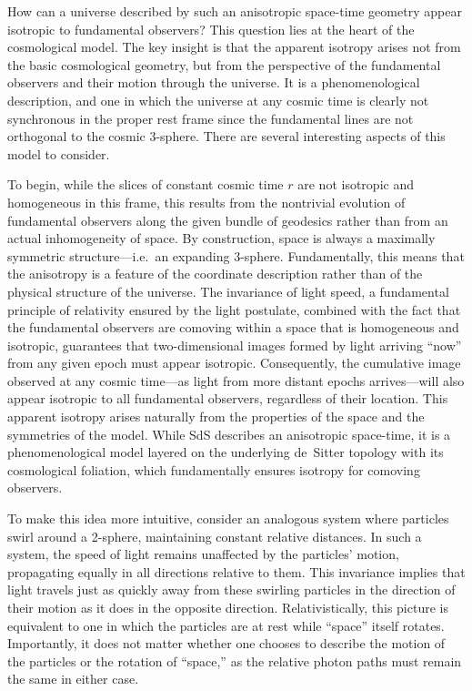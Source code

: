 \documentclass[aps,rmp,groupedaddress,twocolumn,10pt]{revtex4-2}
\begin{document}
How can a universe described by such an anisotropic space-time geometry appear isotropic to fundamental observers? This question lies at the heart of the cosmological model. The key insight is that the apparent isotropy arises not from the basic cosmological geometry, but from the perspective of the fundamental observers and their motion through the universe. It is a phenomenological description, and one in which the universe at any cosmic time is clearly not synchronous in the proper rest frame since the fundamental lines are not orthogonal to the cosmic 3-sphere. There are several interesting aspects of this model to consider.

To begin, while the slices of constant cosmic time $r$ are not isotropic and homogeneous in this frame, this results from the nontrivial evolution of fundamental observers along the given bundle of geodesics rather than from an actual inhomogeneity of space. By construction, space is always a maximally symmetric structure---i.e.\ an expanding 3-sphere. Fundamentally, this means that the anisotropy is a feature of the coordinate description rather than of the physical structure of the universe. The invariance of light speed, a fundamental principle of relativity ensured by the light postulate, combined with the fact that the fundamental observers are comoving within a space that is homogeneous and isotropic, guarantees that two-dimensional images formed by light arriving ``now'' from any given epoch must appear isotropic. Consequently, the cumulative image observed at any cosmic time---as light from more distant epochs arrives---will also appear isotropic to all fundamental observers, regardless of their location. This apparent isotropy arises naturally from the properties of the space and the symmetries of the model. While SdS describes an anisotropic space-time, it is a phenomenological model layered on the underlying de~Sitter topology with its cosmological foliation, which fundamentally ensures isotropy for comoving observers.

To make this idea more intuitive, consider an analogous system where particles swirl around a 2-sphere, maintaining constant relative distances. In such a system, the speed of light remains unaffected by the particles' motion, propagating equally in all directions relative to them. This invariance implies that light travels just as quickly away from these swirling particles in the direction of their motion as it does in the opposite direction. Relativistically, this picture is equivalent to one in which the particles are at rest while ``space'' itself rotates. Importantly, it does not matter whether one chooses to describe the motion of the particles or the rotation of ``space,'' as the relative photon paths must remain the same in either case.
\end{document}
